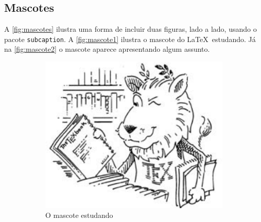 \subsection{Mascotes}\label{sec:mascotes}


A \autoref{fig:mascotes} ilustra uma forma de incluir duas figuras, lado a lado, usando o pacote \texttt{subcaption}. A \autoref{fig:mascote1} ilustra o mascote do \LaTeX~estudando. Já na \autoref{fig:mascote2} o mascote aparece apresentando algum assunto.

\begin{figure}[ht]
    \centering
    \caption{O mascote do~\LaTeX~em diferentes poses}\label{fig:mascotes}

    \begin{subfigure}[t]{.4\textwidth}
        \centering
        \includegraphics[width=\textwidth]{figuras/lion.pdf}
        \caption{O mascote estudando}\label{fig:mascote1}
    \end{subfigure}
    \begin{subfigure}[t]{.4\textwidth}
        \centering

\end{subfigure}
\end{figure}
